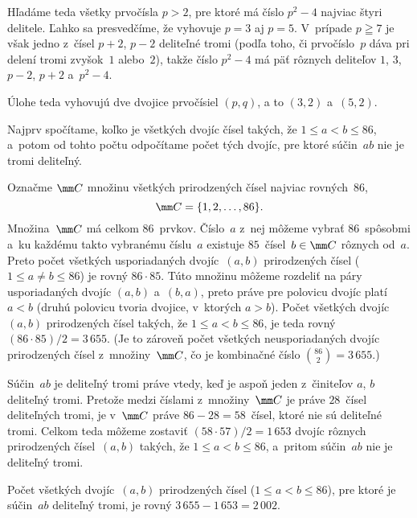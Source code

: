 {Hľadáme teda všetky prvočísla $p>2$, pre ktoré má číslo $p^2-4$
najviac štyri delitele. Ľahko sa presvedčíme, že vyhovuje $p=3$
aj $p=5$. V~prípade $p\geqq7$ je však jedno z~čísel $p+2$, $p-2$
deliteľné tromi (podľa toho, či prvočíslo~$p$ dáva pri delení
tromi zvyšok~$1$ alebo~$2$), takže číslo $p^2-4$ má päť rôznych
deliteľov $1$, $3$, $p-2$, $p+2$ a~$p^2-4$.

Úlohe teda vyhovujú dve dvojice prvočísiel $(p,q)$, a to $(3,2)$ a~$(5,2)$.}

{%
Najprv spočítame, koľko je všetkých dvojíc čísel takých, že $1\le
a<b\le86$, a~potom od tohto počtu odpočítame počet tých dvojíc, pre
ktoré súčin~$ab$ nie je tromi deliteľný.

Označme $\mm C$ množinu všetkých prirodzených čísel najviac rovných~$86$,
$$
\mm C=\{1,2,\dots,86\}.
$$
Množina~$\mm C$ má celkom $86$~prvkov. Číslo~$a$ z~nej môžeme vybrať
$86$~spôsobmi a~ku každému takto vybranému číslu~$a$ existuje
$85$~čísel~$b\in\mm C$ rôznych od~$a$. Preto počet všetkých
usporiadaných dvojíc~$(a,b)$ prirodzených čísel ($1\le a\ne
b\le86$) je rovný $86\cdot 85$. Túto množinu môžeme rozdeliť na
páry usporiadaných dvojíc $(a,b)$ a~$(b,a)$, preto práve pre
polovicu dvojíc platí $a<b$ (druhú polovicu tvoria dvojice,
v~ktorých $a>b$). Počet všetkých dvojíc~$(a,b)$ prirodzených čísel
takých, že $1\le a<b\le86$, je teda rovný $(86\cdot 85)/2=3\,655$.
(Je to zároveň počet všetkých neusporiadaných dvojíc
prirodzených čísel z~množiny~$\mm C$, čo je kombinačné
číslo ${86\choose2}=3\,655$.)

Súčin~$ab$ je deliteľný tromi práve vtedy, keď je aspoň jeden
z~činiteľov $a$, $b$ deliteľný tromi. Pretože medzi číslami z~množiny~$\mm C$
je práve $28$~čísel deliteľných tromi, je v~$\mm C$ práve
$86-28=58$~čísel, ktoré nie sú deliteľné tromi. Celkom teda môžeme
zostaviť $(58\cdot 57)/2=1\,653$ dvojíc rôznych
prirodzených čísel~$(a,b)$ takých, že $1\le a<b\le86$, a~pritom
súčin~$ab$ nie je deliteľný tromi.

Počet všetkých dvojíc~$(a,b)$ prirodzených čísel ($1\le a<b\le86$),
pre ktoré je súčin~$ab$ deliteľný tromi, je rovný
$3\,655-1\,653=2\,002$.

}
